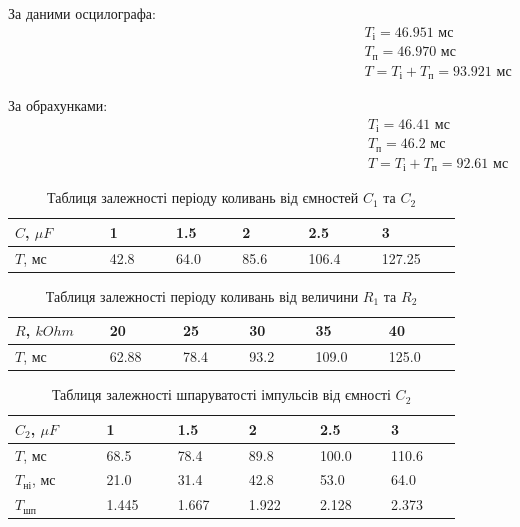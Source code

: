 \documentclass{article}
\begin{document}
\begin{normalsize}
	\begin{multicols}{2}
		За даними осцилографа:
		\begin{gather}
			T_{\text{і}}=46.951\text{ мс}\nonumber\\
			T_{\text{п}}=46.970\text{ мс}\nonumber\\
			T=T_{\text{і}}+T_{\text{п}}=93.921\text{ мс}\nonumber
		\end{gather}
		
		\columnbreak
		
		За обрахунками:
		\begin{gather}
			T_{\text{і}}=46.41\text{ мс}\nonumber\\
			T_{\text{п}}=46.2\text{ мс}\nonumber\\
			T=T_{\text{і}}+T_{\text{п}}=92.61\text{ мс}\nonumber
		\end{gather}
	\end{multicols}

	\begin{table}[H]
		\centering
		\renewcommand*\arraystretch{1.3}
		\begin{tabular}{|p{0.12\linewidth}|p{0.08\linewidth}|p{0.08\linewidth}|p{0.08\linewidth}|p{0.08\linewidth}|p{0.08\linewidth}|}
			\hline
			$C$, $\mu F$&1&1.5&2&2.5&3\\
			\hline
			$T$, мс&42.8&64.0&85.6&106.4&127.25\\
			\hline
		\end{tabular}
		\caption{Таблиця залежності періоду коливань від ємностей $C_1$ та $C_2$}
	\end{table}
	
	\begin{table}[H]
		\centering
		\renewcommand*\arraystretch{1.3}
		\begin{tabular}{|p{0.12\linewidth}|p{0.08\linewidth}|p{0.08\linewidth}|p{0.08\linewidth}|p{0.08\linewidth}|p{0.08\linewidth}|}
			\hline
			$R$, $kOhm$&20&25&30&35&40\\
			\hline
			$T$, мс&62.88&78.4&93.2&109.0&125.0\\
			\hline
		\end{tabular}
		\caption{Таблиця залежності періоду коливань від величини $R_1$ та $R_2$}
	\end{table}
	
	\begin{table}[H]
		\centering
		\renewcommand*\arraystretch{1.3}
		\begin{tabular}{|p{0.12\linewidth}|p{0.08\linewidth}|p{0.08\linewidth}|p{0.08\linewidth}|p{0.08\linewidth}|p{0.08\linewidth}|}
			\hline
			$C_2$, $\mu F$&1&1.5&2&2.5&3\\
			\hline
			$T$, мс&68.5&78.4&89.8&100.0&110.6\\
			\hline
			$T_{\text{ні}}$, мс&21.0&31.4&42.8&53.0&64.0\\
			\hline
			$T_{\text{шп}}$&1.445&1.667&1.922&2.128&2.373\\
			\hline
		\end{tabular}
		\caption{Таблиця залежності шпаруватості імпульсів від ємності $C_2$}
	\end{table}
	

\end{normalsize}
\end{document}
